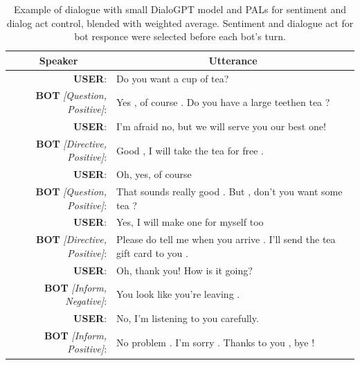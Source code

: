 \documentclass[11pt]{article}
\begin{document}
\begin{table}[]
\begin{tabular}{rl}
\multicolumn{1}{c}{Speaker}    & \multicolumn{1}{c}{Utterance}                                            \\ \hline
\textbf{USER}:                          & Do you want a cup of tea?                                                \\
\textbf{BOT} \textit{{[}Question, Positive{]}}:  & Yes , of course . Do you have a large teethen tea ?                      \\
\textbf{USER}:                          & I'm afraid no, but we will serve you our best one!                       \\
\textbf{BOT} \textit{{[}Directive, Positive{]}}: & Good , I will take the tea for free .                                    \\
\textbf{USER}:                          & Oh, yes, of course                                                       \\
\textbf{BOT} \textit{{[}Question, Positive{]}}:  & That sounds really good . But , don't you want some tea ?                \\
\textbf{USER}:                          & Yes, I will make one for myself too                                      \\
\textbf{BOT} \textit{{[}Directive, Positive{]}}: & Please do tell me when you arrive . I'll send the tea gift card to you . \\
\textbf{USER}:                          & Oh, thank you! How is it going?                                          \\
\textbf{BOT} \textit{{[}Inform, Negative{]}}:    & You look like you're leaving .                                           \\
\textbf{USER}:                          & No, I'm listening to you carefully.                                      \\
\textbf{BOT} \textit{{[}Inform, Positive{]}}:    & No problem . I'm sorry . Thanks to you , bye !                          
\end{tabular}
\caption{Example of dialogue with small DialoGPT model and PALs for sentiment and dialog act control, blended with weighted average. Sentiment and dialogue act for bot responce were selected before each bot's turn.}
\label{tab:tea_example_dialogue}
\end{table}
\end{document}
